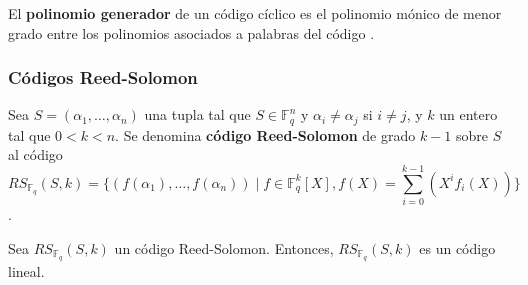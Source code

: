 \begin{definition}
	El \textbf{polinomio generador} de un código cíclico es el polinomio mónico de menor grado entre los polinomios asociados a palabras del código \autocite{VERLINDE2003203}.
\end{definition}

\subsubsection{Códigos Reed-Solomon}

\begin{definition}
	Sea $S = (\alpha_1, \dots, \alpha_n)$ una tupla tal que $S \in \mathbb{F}_q^n$ y $\alpha_i \neq \alpha_j$ si $i \neq j$, y $k$ un entero tal que $0 < k < n$. Se denomina \textbf{código Reed-Solomon} de grado $k-1$ sobre $S$ al código
	\[RS_{\mathbb{F}_q}(S, k) = \big\{(f(\alpha_1), \dots, f(\alpha_n)) \mid f \in \mathbb{F}_q^k[X], f(X) = \sum_{i=0}^{k-1}(X^i f_i(X)) \big\}\]
	\autocite{Venkatesan}.
\end{definition}

\begin{theorem}
	Sea $RS_{\mathbb{F}_q}(S, k)$ un código Reed-Solomon. Entonces, $RS_{\mathbb{F}_q}(S, k)$ es un código lineal.
\end{theorem}

